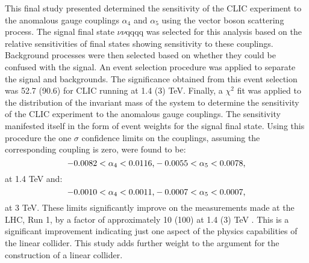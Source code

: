 This final study presented determined the sensitivity of the CLIC experiment to the anomalous gauge couplings $\alpha_{4}$ and $\alpha_{5}$ using the vector boson scattering process.  The signal final state ${\nu}{\nu}$qqqq was selected for this analysis based on the relative sensitivities of final states showing sensitivity to these couplings.  Background processes were then selected based on whether they could be confused with the signal.  An event selection procedure was applied to separate the signal and backgrounds.  The significance obtained from this event selection was 52.7 (90.6) for CLIC running at 1.4 (3) TeV.  Finally, a $\chi^{2}$ fit was applied to the distribution of the invariant mass of the system to determine the sensitivity of the CLIC experiment to the anomalous gauge couplings.  The sensitivity manifested itself in the form of event weights for the signal final state.  Using this procedure the one $\sigma$ confidence limits on the couplings, assuming the corresponding coupling is zero, were found to be:
%
\begin{equation}
-0.0082 < \alpha_{4} < 0.0116 \text{,} \\
-0.0055 < \alpha_{5} < 0.0078 \text{,} \\
\end{equation}
%
\noindent at 1.4 TeV and:
%
\begin{equation}
-0.0010 < \alpha_{4} < 0.0011 \text{,} \\
-0.0007 < \alpha_{5} < 0.0007 \text{,} \\
\end{equation}
%
\noindent at 3 TeV.  These limits significantly improve on the measurements made at the LHC, Run 1, by a factor of approximately 10 (100) at 1.4 (3) TeV \cite{Green:2016trm}.  This is a significant improvement indicating just one aspect of the physics capabilities of the linear collider.  This study adds further weight to the argument for the construction of a linear collider.   

